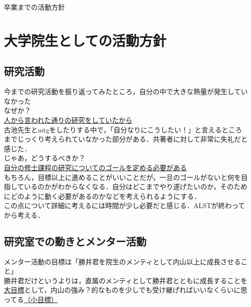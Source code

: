 \documentclass[a4paper,12pt]{ltjsarticle}
\begin{document}
  \begin{center}
    {\huge 卒業までの活動方針}
  \end{center}

  \section{大学院生としての活動方針}
  \subsection{研究活動}
  今までの研究活動を振り返ってみたところ，自分の中で大きな熱量が発生していなかった\\

  なぜか？\\

  \underline{人から言われた通りの研究をしていたから}\\

  古池先生とmtgをしたりする中で，「自分なりにこうしたい！」と言えるところまでじっくり考えられていなかった部分がある．共著者に対して非常に失礼だと感じた．\\

  じゃあ，どうするべきか？\\

  \underline{自分の修士課程の研究についてのゴールを定める必要がある}\\

  もちろん，目標以上に進めることがいいことだが，一旦のゴールがないと何を目指しているのかがわからなくなる．自分はどこまでやり遂げたいのか，そのためにどのように動く必要があるのかなどを考えられるようにする．\\

  この点について詳細に考えるには時間が少し必要だと感じる．ALSTが終わってから考える．\\

  \clearpage

  \subsection{研究室での動きとメンター活動}
  メンター活動の目標は「勝井君を院生のメンティとして内山以上に成長させること」\\

  勝井君だけというよりは，直属のメンティとして勝井君とともに成長することを\underline{大目標}として，内山の強み？的なものを少しでも受け継げればいいなくらいに思ってる\underline{（小目標）}\\
\end{document}
